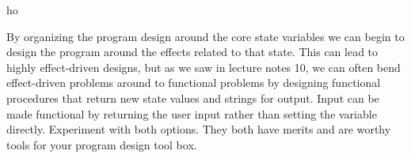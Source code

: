 ho\documentclass[]{tufte-handout}
\begin{document}
By organizing the program design around the core state variables we can begin to design the program around the effects related to that state. This can lead to highly effect-driven designs, but as we saw in lecture notes 10, we can often bend effect-driven problems around to functional problems by designing functional procedures that return new state values and strings for output. Input can be made functional by returning the user input rather than setting the variable directly. Experiment with both options. They both have merits and are worthy tools for your program design tool box.
\end{document}
